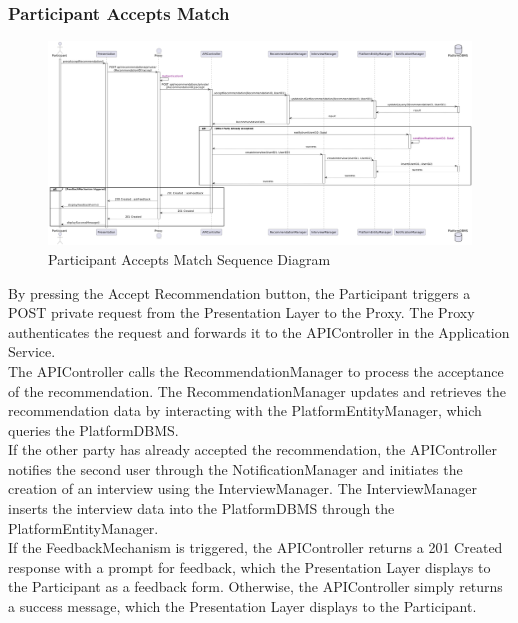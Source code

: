 \subsubsection*{Participant Accepts Match}
\begin{figure}[H]
    \centering
    \includegraphics[width=\linewidth]{Latex/Images/DD/SequenceDiagrams/6.1ParticipantAcceptsMatch.png}
    \caption{Participant Accepts Match Sequence Diagram}
    \label{fig:partacceptmatch}
\end{figure}
By pressing the Accept Recommendation button, the Participant triggers a POST private request from the Presentation Layer to the Proxy. The Proxy authenticates the request and forwards it to the APIController in the Application Service.\\
The APIController calls the RecommendationManager to process the acceptance of the recommendation. The RecommendationManager updates and retrieves the recommendation data by interacting with the PlatformEntityManager, which queries the PlatformDBMS.\\
If the other party has already accepted the recommendation, the APIController notifies the second user through the NotificationManager and initiates the creation of an interview using the InterviewManager. The InterviewManager inserts the interview data into the PlatformDBMS through the PlatformEntityManager.\\
If the FeedbackMechanism is triggered, the APIController returns a 201 Created response with a prompt for feedback, which the Presentation Layer displays to the Participant as a feedback form. Otherwise, the APIController simply returns a success message, which the Presentation Layer displays to the Participant.


